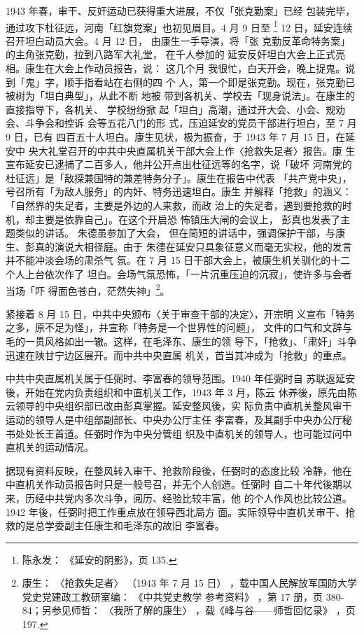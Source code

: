 1943 年春，审干、反奸运动已获得重大进展，不仅「张克勤案」已经 包装完毕，
通过攻下杜征远，河南「红旗党案」也初见眉目。4 月 9 日至 \footnote{陈永发：
《延安的阴影》，页 135.} 12 日，延安连续召开坦白动员大会。4 月 12 日，
由康生一手导演，将「张 克勤反革命特务案」的主角张克勤，拉到八路军大礼堂，
在千人参加的 延安反奸坦白大会上正式亮相。康生在大会上作动员报告，说：
这几个月 我很忙，白天开会，晚上捉鬼。说到「鬼」字，顺手指看站在右侧的四
个 人，第一个即是张克勤。现在，张克勤已被树为「坦白典型」，从此不断 地被
带到各机关、学校去「现身说法」。在康生的直接指导下，各机关、 学校纷纷掀
起「坦白」高潮，通过开大会、小会、规劝会、斗争会和控诉 会等五花八门的形
式，压迫延安的党员干部进行坦白，至 7 月 9 日，已有
四百五十人坦白。康生见状，极为振奋，于 1943 年 7 月 15 日，在延安中
央大礼堂召开的中共中央直属机关干部大会上作〈抢救失足者〉报告。康
生宣布延安已逮捕了二百多人，他并公开点出杜征远等的名字，说「破坏
河南党的杜征远」是「敌探兼国特的兼差特务分子」。康生在报告中代表
「共产党中央」，号召所有「为敌人服务」的内奸、特务迅速坦白。康生
并解释「抢救」的涵义：「自然界的失足者，主要是外边的人来救，而政
治上的失足者，遇到要抢救的时机，却主要是依靠自己」。在这个开启恐
怖镇压大闸的会议上，
彭真也发表了主题类似的讲话。
朱德虽参加了大会，
但在简短的讲话中，强调保护干部，与康生、彭真的演说大相径庭。由于
朱德在延安只具象征意义而毫无实权，他的发言并不能冲淡会场的肃杀气
氛。在 7 月 15 日干部大会上，被康生机关驯化的十二个人上台依次作了
坦白。会场气氛恐怖，「一片沉重压迫的沉寂」，使许多与会者当场「吓
得面色苍白，茫然失神」\footnote{康生：
〈抢救失足者〉
（1943 年 7 月 15 日）
，载中国人民解放军国防大学党史党建政工教研室编：
《中共党史教学
参考资料》
，第 17 册，页 380-84；另参见师哲：
〈我所了解的康生〉
，载《峰与谷——师哲回忆录》
，页 197.}。

紧接着 8 月 15 日，中共中央颁布〈关于审查干部的决定〉，开宗明
义宣布「特务之多，原不足为怪」，并宣称「特务是一个世界性的问题」，
文件的口气和文辞与毛的一贯风格如出一辙。这样，在毛泽东、康生的领
导下，「抢救」、「肃奸」斗争迅速在陕甘宁边区展开。而中共中央直属
机关，首当其冲成为「抢救」的重点。

中共中央直属机关属于任弼时、李富春的领导范围。1940 年任弼时自
苏联返延安後，开始在党内负责组织和中直机关工作，1943 年 3 月，陈云
休养後，原先由陈云领导的中央组织部已改由彭真掌握。延安整风後，实
际负责中直机关整风审干运动的领导人是中组部副部长、中央办公厅主任
李富春，及其副手中央办公厅秘书处处长王首道。任弼时作为中央分管组
织及中直机关的领导人，也可能过问中直机关的运动情况。

据现有资料反映，在整风转入审干、抢救阶段後，任弼时的态度比较
冷静，他在中直机关作动员报告时只是一般号召，并无个人创造。任弼时
自二十年代後期以来，历经中共党内多次斗争，阅历、经验比较丰富，他
的个人作风也比较公道。1942 年後，任弼时把工作重点放在领导西北局方
面。实际领导中直机关审干、抢救的是总学委副主任康生和毛泽东的故旧
李富春。

